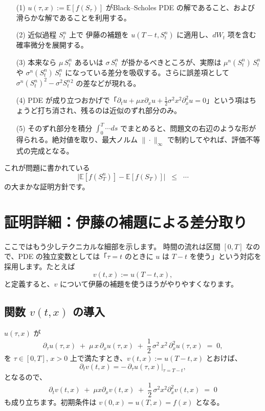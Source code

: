 \documentclass[a4paper]{jsarticle}
\begin{document}
\begin{enumerate}  
\item[(1)] $u(\tau,x) := \mathbb{E}[f(S_\tau)]$ がBlack--Scholes PDE の解であること、および滑らかな解であることを利用する。  
\item[(2)] 近似過程 $S_t^n$ 上で 伊藤の補題を $u(T-t,S_t^n)$ に適用し、$dW_t$ 项を含む確率微分を展開する。  
\item[(3)] 本来なら $\mu\,S_t^n$ あるいは $\sigma\,S_t^n$ が掛かるべきところが、実際は $\mu^n(S_t^n)\,S_t^n$ や $\sigma^n(S_t^n)\,S_t^n$ になっている差分を吸収する。さらに誤差項として $\sigma^n(S_t^n)^2 - \sigma^2 S_t^n{}^2$ の差などが現れる。  
\item[(4)] PDE が成り立つおかげで「$\partial_t u + \mu x \partial_x u + \frac12 \sigma^2 x^2 \partial^2_x u = 0$」という項はちょうど打ち消され、残るのは近似のずれ部分のみ。  
\item[(5)] そのずれ部分を積分 $\int_0^T \cdots ds$ でまとめると、問題文の右辺のような形が得られる。絶対値を取り、最大ノルム $\|\cdot\|_\infty$ で制約してやれば、評価不等式の完成となる。  
\end{enumerate}  

これが問題に書かれている  
\[  
  \bigl|\mathbb{E}[f(S_T^n)] - \mathbb{E}[f(S_T)]\bigr|  
  \;\;\le\;\;\cdots  
\]  
の大まかな証明方針です。  

\vspace{5mm}  

\section{証明詳細：伊藤の補題による差分取り}  

ここではもう少しテクニカルな細部を示します。  
時間の流れは区間 $[0,T]$ なので、PDE の独立変数としては「$\tau=t$ のときに $u$ は $T-t$ を使う」という対応を採用します。たとえば  
\[  
  v(t, x)  
  :=   
  u(T-t, x),  
\]  
と定義すると、$v$ について伊藤の補題を使うほうがやりやすくなります。  

\subsection{関数 $v(t,x)$ の導入}  

$u(\tau,x)$ が  
\[  
  \partial_\tau u(\tau,x)  
  \;+\;  
  \mu\, x \,\partial_x u(\tau,x)  
  \;+\;  
  \frac12\,\sigma^2\,x^2\,\partial_x^2 u(\tau,x)  
  \;=\;0,  
\]  
を $\tau\in[0,T]$, $x>0$ 上で満たすとき、$v(t,x):=u(T-t,x)$ とおけば、  
\[  
  \partial_t v(t,x)  
  =   
  -\,\partial_\tau u(\tau,x)\big|_{\tau=T-t},  
\]  
となるので、  
\[  
  \partial_t v(t,x)  
  \;+\;  
  \mu x \partial_x v(t,x)  
  \;+\;  
  \frac12\,\sigma^2 x^2 \partial_x^2 v(t,x)  
  \;=\;0  
\]  
も成り立ちます。初期条件は $v(0,x) = u(T,x) = f(x)$ となる。  
\end{document}
